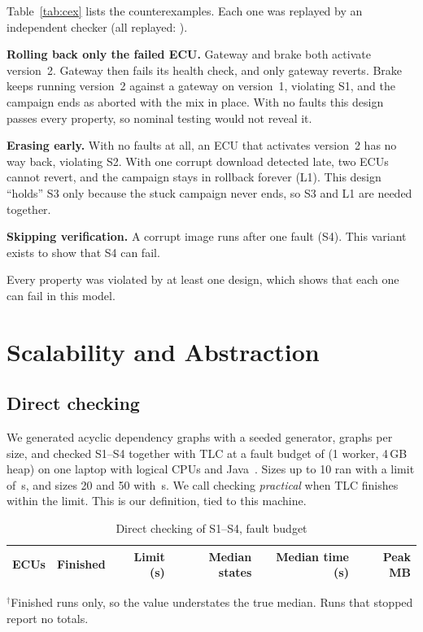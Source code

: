 \documentclass[journal]{IEEEtran}
\begin{document}
Table~\ref{tab:cex} lists the counterexamples. Each one was replayed by an independent checker (all replayed: \ReplayAll).

\textbf{Rolling back only the failed ECU.} Gateway and brake both activate version~2. Gateway then fails its health check, and only gateway reverts. Brake keeps running version~2 against a gateway on version~1, violating S1, and the campaign ends as aborted with the mix in place. With no faults this design passes every property, so nominal testing would not reveal it.

\textbf{Erasing early.} With no faults at all, an ECU that activates version~2 has no way back, violating S2. With one corrupt download detected late, two ECUs cannot revert, and the campaign stays in rollback forever (L1). This design ``holds'' S3 only because the stuck campaign never ends, so S3 and L1 are needed together.

\textbf{Skipping verification.} A corrupt image runs after one fault (S4). This variant exists to show that S4 can fail.

Every property was violated by at least one design, which shows that each one can fail in this model.

\section{Scalability and Abstraction}
\label{sec:scale}

\subsection{Direct checking}
We generated acyclic dependency graphs with a seeded generator, \ScaleSeeds{} graphs per size, and checked S1--S4 together with TLC at a fault budget of \ScaleFaultBudget{} (1 worker, 4\,GB heap) on one laptop with \MachineCpus{} logical CPUs and Java~\MachineJava. Sizes up to 10 ran with a limit of \ScaleLongLimit\,s, and sizes 20 and 50 with \ScaleShortLimit\,s. We call checking \emph{practical} when TLC finishes within the limit. This is our definition, tied to this machine.

\begin{table}[t]
\caption{Direct checking of S1--S4, fault budget \ScaleFaultBudget}
\label{tab:scale}
\centering
\footnotesize
\setlength{\tabcolsep}{3pt}
\begin{tabular}{@{}rcrrrr@{}}
\toprule
ECUs & Finished & Limit (s) & Median states & Median time (s) & Peak MB \\
\midrule

\end{tabular}

\smallskip
\raggedright\scriptsize $^\dagger$Finished runs only, so the value understates the true median. Runs that stopped report no totals.
\end{table}
\end{document}
